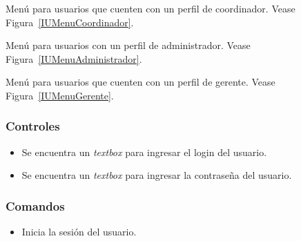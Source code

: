 
Menú para usuarios que cuenten con un perfil de coordinador. Vease Figura~\ref{IUMenuCoordinador}.


Menú para usuarios  con un perfil de administrador. Vease Figura~\ref{IUMenuAdministrador}.


Menú para usuarios que cuenten con un perfil de gerente. Vease Figura~\ref{IUMenuGerente}.





\subsubsection{Controles}
\begin{itemize}
 \item Se encuentra un \textit{textbox} para ingresar el login del usuario.
 \item Se encuentra un \textit{textbox} para ingresar la contraseña del usuario.
\end{itemize}

\subsubsection{Comandos}
\begin{itemize}
 \item {} Inicia la sesión del usuario.

\end{itemize}


